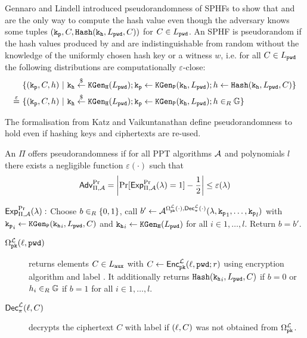 \noindent
Gennaro and Lindell \cite{Gennaro2003} introduced pseudorandomness of SPHFs to show that \Hash and \PHash are the only way to compute the hash value even though the adversary knows some tuples $(\mathtt{k_p},C,\mathtt{Hash}(\mathtt{k_h},\allowbreak L_\mathtt{pwd},C))$ for $C\in L_\mathtt{pwd}$.
An SPHF is pseudorandom if the hash values produced by \Hash and \PHash are indistinguishable from random without the knowledge of the uniformly chosen hash key \hk or a witness $w$, i.e. for all $C\in L_\mathtt{pwd}$ the following distributions are computationally $\varepsilon$-close:
\begin{align*}
& \{(\mathtt{k_p},C,h) ~|~ \mathtt{k_h}\stackrel{\$}{\gets}\mathtt{KGen_H}(L_\mathtt{pwd}); \mathtt{k_p}\gets\mathtt{KGen_P}(\mathtt{k_h},L_\mathtt{pwd}); h\gets\mathtt{Hash}(\mathtt{k_h},L_\mathtt{pwd},C)\} \\
\stackrel{\varepsilon}{=}~ & \{(\mathtt{k_p},C,h) ~|~ \mathtt{k_h}\stackrel{\$}{\gets}\mathtt{KGen_H}(L_\mathtt{pwd}); \mathtt{k_p}\gets\mathtt{KGen_P}(\mathtt{k_h},L_\mathtt{pwd}); h\in_R\mathbb{G}\}
\end{align*}

\noindent
The formalisation from Katz and Vaikuntanathan \cite{Katz2011} define pseudorandomness to hold even if hashing keys and ciphertexts are re-used.

\begin{definition}[Pseudorandomness]\label{def:prplusc}
An \SPHF $\Pi$ offers pseudorandomness if for all PPT algorithms $\mathcal{A}$ and polynomials $l$ there exists a negligible function $\varepsilon(\cdot)$ such that
\[\mathsf{Adv}_{\Pi,\mathcal{A}}^{\Pr}=\left|\Pr[\mathsf{Exp}_{\Pi,\mathcal{A}}^{\Pr}(\lambda)=1] - \frac12 \right|\leq \varepsilon(\lambda)\]

\noindent
$\mathsf{Exp}_{\Pi,\mathcal{A}}^{\Pr}(\lambda):$ Choose $b\in_R\{0,1\}$, call $b'\gets\mathcal{A}^{\Omega^{\mathcal{L}}_\mathtt{pk}(\cdot),\mathsf{Dec}^\mathcal{L}_\pi(\cdot)}(\lambda,\mathtt{k_p}_1,\dots,\mathtt{k_p}_l)$ with $\mathtt{k_p}_i\gets\mathtt{KGen_P}(\mathtt{k_h}_i,L_\mathtt{pwd},C)$ and $\mathtt{k_h}_i\gets\mathtt{KGen_H}(L_\mathtt{pwd})$ for all $i\in 1,\dots,l$.
Return $b=b'$.

\begin{description}
	\item[$\Omega^{\mathcal{L}}_\mathtt{pk}(\ell,\mathtt{pwd})$] returns elements $C\in L_\mathtt{aux}$ with $C\gets\mathsf{Enc}^\mathcal{L}_\mathtt{pk}(\ell,\allowbreak\mathtt{pwd};r)$ using encryption algorithm \cL and label \Label.
    	It additionally returns $\mathtt{Hash}(\mathtt{k_h}_{i},L_\mathtt{pwd},C)$ if $b=0$ or $h_{i}\in_R\mathbb{G}$ if $b=1$ for all $i\in 1,\dots, l$.
	
	\item[$\mathsf{Dec}^\mathcal{L}_\pi(\ell,C)$] decrypts the ciphertext $C$ with label \Label if $(\ell,C)$ was not obtained from $\Omega^\mathcal{L}_\mathtt{pk}$.
\end{description}
\end{definition}

